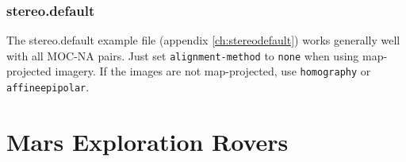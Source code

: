 \subsubsection*{stereo.default}

The stereo.default example file (appendix \ref{ch:stereodefault}) works
generally well with all MOC-NA pairs. Just set \texttt{alignment-method}
to \texttt{none} when using map-projected imagery. If the images are not
map-projected, use \texttt{homography} or \texttt{affineepipolar}.
















\section{Mars Exploration Rovers}\label{mer:example}

